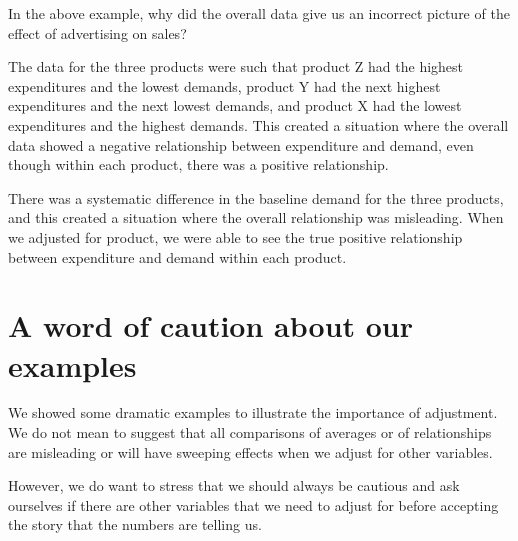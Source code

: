 \documentclass[
  12pt,
  letterpaper,
  DIV=11,
  numbers=noendperiod]{scrreprt}
\begin{document}
\begin{tcolorbox}[enhanced jigsaw, colback=white, leftrule=.75mm, toprule=.15mm, bottomtitle=1mm, breakable, coltitle=black, toptitle=1mm, title={Quick Check}, opacitybacktitle=0.6, colbacktitle=quarto-callout-note-color!10!white, arc=.35mm, left=2mm, colframe=quarto-callout-note-color-frame, titlerule=0mm, rightrule=.15mm, bottomrule=.15mm, opacityback=0]

In the above example, why did the overall data give us an incorrect
picture of the effect of advertising on sales?

\end{tcolorbox}

\begin{tcolorbox}[enhanced jigsaw, colback=white, leftrule=.75mm, toprule=.15mm, bottomtitle=1mm, breakable, coltitle=black, toptitle=1mm, title={Suggested answer}, opacitybacktitle=0.6, colbacktitle=quarto-callout-note-color!10!white, arc=.35mm, left=2mm, colframe=quarto-callout-note-color-frame, titlerule=0mm, rightrule=.15mm, bottomrule=.15mm, opacityback=0]

The data for the three products were such that product Z had the highest
expenditures and the lowest demands, product Y had the next highest
expenditures and the next lowest demands, and product X had the lowest
expenditures and the highest demands. This created a situation where the
overall data showed a negative relationship between expenditure and
demand, even though within each product, there was a positive
relationship.

There was a systematic difference in the baseline demand for the three
products, and this created a situation where the overall relationship
was misleading. When we adjusted for product, we were able to see the
true positive relationship between expenditure and demand within each
product.

\end{tcolorbox}

\section{A word of caution about our
examples}\label{a-word-of-caution-about-our-examples}

We showed some dramatic examples to illustrate the importance of
adjustment. We do not mean to suggest that all comparisons of averages
or of relationships are misleading or will have sweeping effects when we
adjust for other variables.

However, we do want to stress that we should always be cautious and ask
ourselves if there are other variables that we need to adjust for before
accepting the story that the numbers are telling us.
\end{document}
